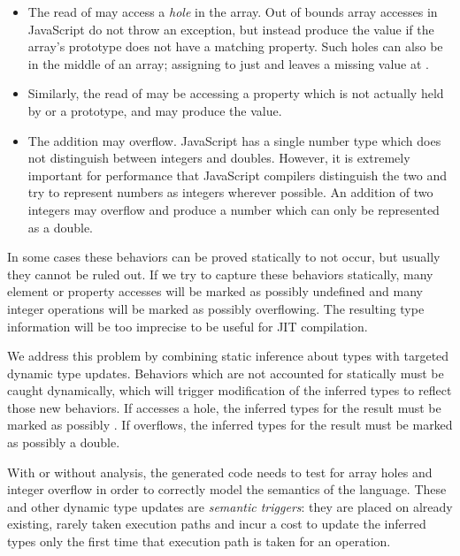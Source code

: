 \begin{itemize}

\item The read of  may access a {\it hole} in the array.
Out of bounds array accesses in JavaScript do not throw an exception,
but instead produce the  value if the array's prototype
does not have a matching property.
Such holes can also be in the middle of an array;
assigning to just  and  leaves a missing
value at .

\item Similarly, the read of  may be accessing a property
which is not actually held by  or a prototype, and may produce the
 value.

\item The addition  may overflow.
JavaScript has a single number type which does not distinguish between
integers and doubles.
However, it is extremely important for performance that JavaScript compilers
distinguish the two and try to represent numbers as
integers wherever possible.
An addition of two integers may overflow and produce a number which can
only be represented as a double.

\end{itemize}

In some cases these behaviors can be proved statically to not occur,
but usually they cannot be ruled out.
If we try to capture these behaviors statically, many element or property
accesses will be marked as possibly undefined and many integer operations
will be marked as possibly overflowing.
The resulting type information will be too imprecise to be useful for
JIT compilation.

We address this problem by combining static inference about types
with targeted dynamic type updates.
Behaviors which are not accounted for statically must be caught dynamically,
which will trigger modification of the inferred types to reflect
those new behaviors.
If  accesses a hole, the inferred types for the result must be
marked as possibly .
If  overflows, the inferred types for the result must be
marked as possibly a double.

With or without analysis, the generated code needs to test for array holes
and integer overflow in order to correctly model the semantics of the language.
These and other dynamic type updates are {\it semantic triggers}:
they are placed on already existing, rarely taken execution paths
and incur a cost to update the inferred types only the first time that
execution path is taken for an operation.

